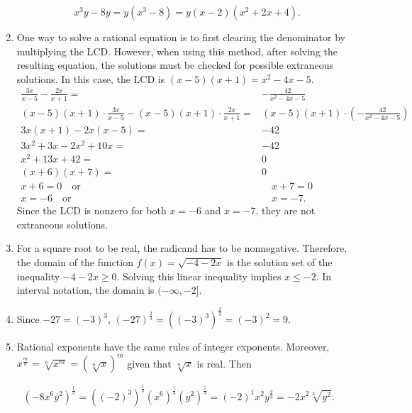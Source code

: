 \documentclass[
  12pt]{article}
\begin{document}
\begin{enumerate}
  \[x^3y-8y=y(x^3-8)=y(x-2)(x^2+2x+4).\]
\item
  One way to solve a rational equation is to first clearing the
  denominator by multiplying the LCD. However, when using this method,
  after solving the resulting equation, the solutions must be checked
  for possible extraneous solutions. In this case, the LCD is
  \((x-5)(x+1)=x^2-4x-5\). \[
   \begin{aligned}
   \frac{3x}{x-5}-\frac{2x}{x+1}=&-\frac{42}{x^2-4x-5}\\
   (x-5)(x+1)\cdot\frac{3x}{x-5}-(x-5)(x+1)\cdot\frac{2x}{x+1}=&(x-5)(x+1)\cdot\left(-\frac{42}{x^2-4x-5}\right)\\
   3x(x+1)-2x(x-5)=&-42\\
   3x^2+3x-2x^2+10x=&-42\\
   x^2+13x+42=&0\\
   (x+6)(x+7)=&0\\
   x+6=0\quad\text{or}&\quad x+7=0\\
   x=-6\quad\text{or}&\quad x=-7.
   \end{aligned}
   \] Since the LCD is nonzero for both \(x=-6\) and \(x=-7\), they are
  not extraneous solutions.
\item
  For a square root to be real, the radicand has to be nonnegative.
  Therefore, the domain of the function \(f(x)=\sqrt{-4-2x}\) is the
  solution set of the inequality \(-4-2x\ge 0\). Solving this linear
  inequality implies \(x\le -2\). In interval notation, the domain is
  \((-\infty, -2]\).
\item
  Since \(-27=(-3)^3\), \((-27)^{\frac23}=((-3)^3)^{\frac23}=(-3)^2=9\).
\item
  Rational exponents have the same rules of integer exponents. Moreover,
  \(x^{\frac mn}=\sqrt[n]{x^m}=(\sqrt[n]{x})^m\) given that
  \(\sqrt[n]x\) is real. Then
\end{enumerate}

\[
(-8x^6y^2)^{\frac13}=((-2)^3)^{\frac13}(x^6)^{\frac13}(y^2)^{\frac13}=(-2)^1x^2y^{\frac23}=-2x^2\sqrt[3]{y^2}.
\]
\end{document}
